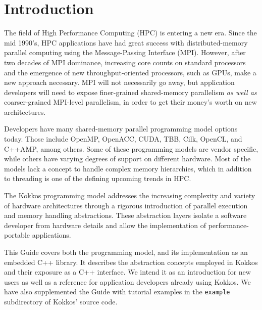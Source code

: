

\chapter{Introduction}\label{C:intro}

The field of High Performance Computing (HPC) is entering a new era.
Since the mid 1990's, HPC applications have had great success 
with distributed-memory parallel computing using the Message-Passing Interface (MPI).
However, after two decades of MPI dominance, 
increasing core counts on standard processors and the emergence of new throughput-oriented processors, such as GPUs, make a new approach necessary.
MPI will not necessarily go away,
but application developers will need to expose finer-grained shared-memory parallelism
\emph{as well as} coarser-grained MPI-level parallelism,
in order to get their money's worth on new architectures.

Developers have many shared-memory parallel programming model options today.
Those include OpenMP, OpenACC, CUDA, TBB, Cilk, OpenCL, and C++AMP, among others.
Some of these programming models are vendor specific, while others have varying degrees of support on different hardware. 
Most of the models lack a concept to handle complex memory hierarchies, 
which in addition to threading is one of the defining upcoming trends in HPC. 

The Kokkos programming model addresses the increasing complexity and variety of hardware architectures
through a rigorous introduction of parallel execution and memory handling abstractions.
These abstraction layers isolate a software developer from hardware details and allow the implementation of performance-portable applications.

This Guide covers both the programming model, and its implementation as an embedded C++ library.
It describes the abstraction concepts employed in Kokkos and their exposure as a C++ interface.
We intend it as an introduction for new users as well as a reference for application developers already using Kokkos.
We have also supplemented the Guide with tutorial examples in the \verb!example! subdirectory of Kokkos' source code.

